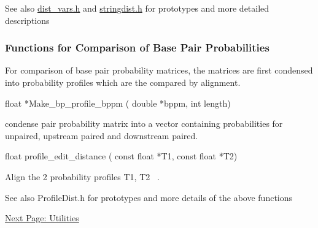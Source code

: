 \begin{DoxySeeAlso}{See also}
\hyperlink{dist__vars_8h}{dist\+\_\+vars.\+h} and \hyperlink{stringdist_8h}{stringdist.\+h} for prototypes and more detailed descriptions
\end{DoxySeeAlso}
\subsubsection*{Functions for Comparison of Base Pair Probabilities}

For comparison of base pair probability matrices, the matrices are first condensed into probability profiles which are the compared by alignment.

\begin{DoxyVerb}float *Make_bp_profile_bppm ( double *bppm,
                              int length)
\end{DoxyVerb}
 condense pair probability matrix into a vector containing probabilities for unpaired, upstream paired and downstream paired.

\begin{DoxyVerb}float profile_edit_distance ( const float *T1,
                              const float *T2)
\end{DoxyVerb}
 Align the 2 probability profiles T1, T2~\newline
.

\begin{DoxySeeAlso}{See also}
Profile\+Dist.\+h for prototypes and more details of the above functions
\end{DoxySeeAlso}
\hyperlink{mp_utils}{Next Page\+: Utilities} 